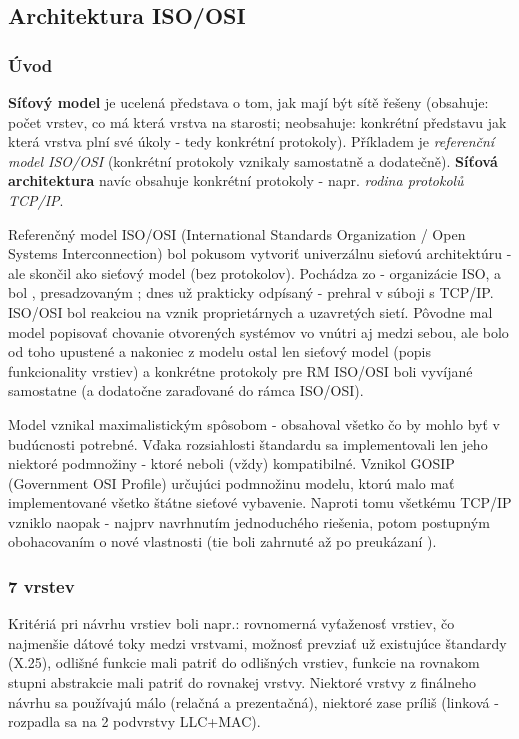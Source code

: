 \subsection{Architektura ISO/OSI}

\subsubsection*{Úvod}
\begin{definice}
\textbf{Síťový model} je ucelená představa o tom, jak mají být sítě řešeny (obsahuje: počet vrstev, co má která vrstva na starosti; neobsahuje: konkrétní představu jak která vrstva plní své úkoly - tedy konkrétní protokoly). Příkladem je \emph{referenční model ISO/OSI} (konkrétní protokoly vznikaly samostatně a dodatečně).
\textbf{Síťová architektura} navíc obsahuje konkrétní protokoly - napr. \emph{rodina protokolů TCP/IP}.
\end{definice}

Referenčný model ISO/OSI (International Standards Organization / Open Systems Interconnection) bol pokusom vytvoriť univerzálnu sieťovú architektúru - ale skončil ako sieťový model (bez protokolov). Pochádza zo  - organizácie ISO, a bol , presadzovaným ; dnes už prakticky odpísaný - prehral v súboji s TCP/IP. ISO/OSI bol reakciou na vznik proprietárnych a uzavretých sietí. Pôvodne mal model popisovať chovanie otvorených systémov vo vnútri aj medzi sebou, ale bolo od toho upustené a nakoniec z modelu ostal len sieťový model (popis funkcionality vrstiev) a konkrétne protokoly pre RM ISO/OSI boli vyvíjané samostatne (a dodatočne zaraďované do rámca ISO/OSI).

Model vznikal maximalistickým spôsobom - obsahoval všetko čo by mohlo byť v budúcnosti potrebné. Vďaka rozsiahlosti štandardu sa implementovali len jeho niektoré podmnožiny - ktoré neboli (vždy) kompatibilné. Vznikol GOSIP (Government OSI Profile) určujúci podmnožinu modelu, ktorú malo mať implementované všetko štátne sieťové vybavenie. Naproti tomu všetkému TCP/IP vzniklo naopak - najprv navrhnutím jednoduchého riešenia, potom postupným obohacovaním o nové vlastnosti (tie boli zahrnuté až po preukázaní ).

\subsubsection*{7 vrstev}
Kritériá pri návrhu vrstiev boli napr.: rovnomerná vyťaženosť vrstiev, čo najmenšie dátové toky medzi vrstvami, možnosť prevziať už existujúce štandardy (X.25), odlišné funkcie mali patriť do odlišných vrstiev, funkcie na rovnakom stupni abstrakcie mali patriť do rovnakej vrstvy. Niektoré vrstvy z finálneho návrhu sa používajú málo (relačná a prezentačná), niektoré zase príliš (linková - rozpadla sa na 2 podvrstvy LLC+MAC).

